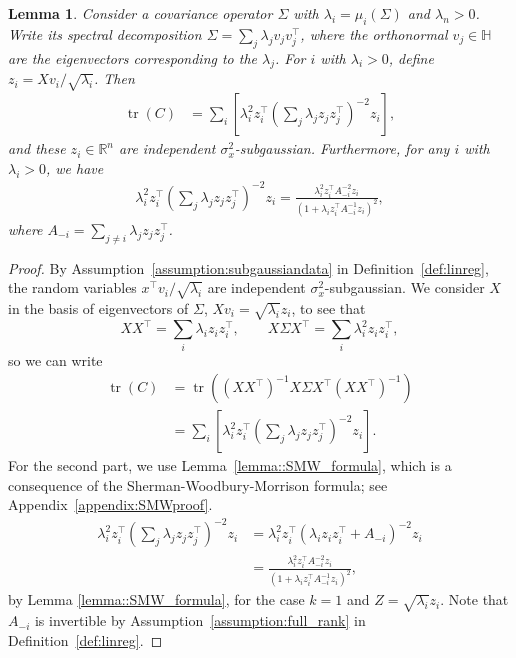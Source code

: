 \documentclass[11pt,notitlepage]{article}
\newcommand\bbH{\mathbb{H}}
\newcommand\R {\mathbb{R}}
\renewcommand\Re{\R}
\newcommand\tr {\ensuremath{\operatorname{\mathrm{tr}}}}
\newtheorem{lemma}[theorem]{Lemma}
\begin{document}
\begin{lemma}\label{lemma::representation_through_z}
  Consider a covariance operator $\Sigma$ with
  $\lambda_i=\mu_i(\Sigma)$ and $\lambda_n>0$. Write its spectral
  decomposition $\Sigma=\sum_{j} \lambda_j v_jv_j^\top$,
  where the orthonormal $v_j\in\bbH$ are the eigenvectors
  corresponding to the $\lambda_j$. 
  For $i$ with $\lambda_i > 0$, define
  $z_i=Xv_i/\sqrt{\lambda_i}$. Then 
    \begin{align*}
      \tr\left(C\right)
        &= \sum_{i}\left[ \lambda_i^2 z_i^\top
          \left(\sum_{j} \lambda_j z_j z_j^\top \right)^{-2}z_i\right],
    \end{align*}
  and these $z_i\in\Re^n$ are independent $\sigma_x^2$-subgaussian.
  Furthermore, for any $i$ with $\lambda_i > 0$, we have
  \begin{align*}
    \lambda_i^2 z_i^\top \left(\sum_{j} \lambda_j z_j z_j^\top
        \right)^{-2}z_i
      = \frac{\lambda_i^2 z_i^\top  A_{-i}^{-2}z_i}
        {(1 + \lambda_i z_i^\top A_{-i}^{-1}z_i)^2},
  \end{align*}
  where $A_{-i} = \sum_{j \neq i} \lambda_j z_j z_j^\top$.
\end{lemma}

\begin{proof}
  By Assumption~\ref{assumption:subgaussiandata} in
  Definition~\ref{def:linreg}, the random
  variables $x^\top v_i/\sqrt{\lambda_i}$ are independent
  $\sigma_x^2$-subgaussian. We consider $X$ in the basis of
  eigenvectors of $\Sigma$, $Xv_i=\sqrt{\lambda_i}z_i$, to see that
  \[
    XX^\top = \sum_i\lambda_i z_i z_i^\top,\qquad
    X\Sigma X^\top = \sum_i\lambda_i^2 z_i z_i^\top,
  \]
  so we can write
    \begin{align*}
      \tr\left(C\right)
        & = \tr\left(\left(X X^\top \right)^{-1}X\Sigma X^\top \left(X
          X^\top \right)^{-1}\right) \\
        & = \sum_{i}\left[ \lambda_i^2 z_i^\top 
          \left(\sum_{j} \lambda_j z_j z_j^\top
          \right)^{-2}z_i\right].
    \end{align*}
  For the second part, we use
  Lemma~\ref{lemma::SMW_formula}, which is
  a consequence of the Sherman-Woodbury-Morrison formula; see
  Appendix~\ref{appendix:SMWproof}.
    \begin{align*}
      \lambda_i^2 z_i^\top  \left(\sum_{j}
        \lambda_j z_j z_j^\top \right)^{-2}z_i
      &= \lambda_i^2 z_i^\top \left(\lambda_i z_i z_i^\top 
        +A_{-i}\right)^{-2}z_i \\
      &= \frac{\lambda_i^2 z_i^\top  A_{-i}^{-2}z_i}
        {(1 + \lambda_i z_i^\top A_{-i}^{-1}z_i)^2},
    \end{align*}
  by Lemma \ref{lemma::SMW_formula}, for the case $k=1$ and
  $Z=\sqrt{\lambda_i}z_i$. Note that $A_{-i}$ is invertible by
  Assumption~\ref{assumption:full_rank} in Definition~\ref{def:linreg}.
\end{proof}
\end{document}

